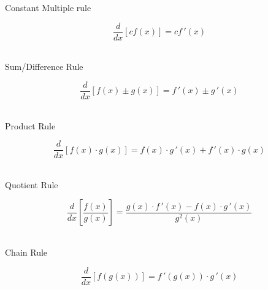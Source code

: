 \documentclass[handout]{ximera}
\begin{document}
\begin{center}
Constant Multiple rule
\end{center}
\[
\frac{d}{dx} \left[ cf(x) \right] = c f\,'(x)
\]
\\
\begin{center}
Sum/Difference Rule
\end{center}
\[
\frac{d}{dx} \left[ f(x) \pm g(x) \right] = f\,'(x) \pm g\,'(x)
\]
\\
\begin{center}
Product Rule
\end{center}
\[
\frac{d}{dx} \left[ f(x) \cdot g(x) \right] = f(x) \cdot g\,'(x) + f\,'(x) \cdot g(x)
\]
\\
\begin{center}
Quotient Rule
\end{center}
\[
\frac{d}{dx} \left[ \frac{f(x)}{g(x)} \right] = \frac{g(x) \cdot f\,'(x) - f(x) \cdot g\,'(x)}{g^2(x)} 
\]
\\
\begin{center}
Chain Rule
\end{center}
\[
\frac{d}{dx} \left[ f(g(x)) \right] = f\,'(g(x)) \cdot g\,'(x)
\]
\end{document}
